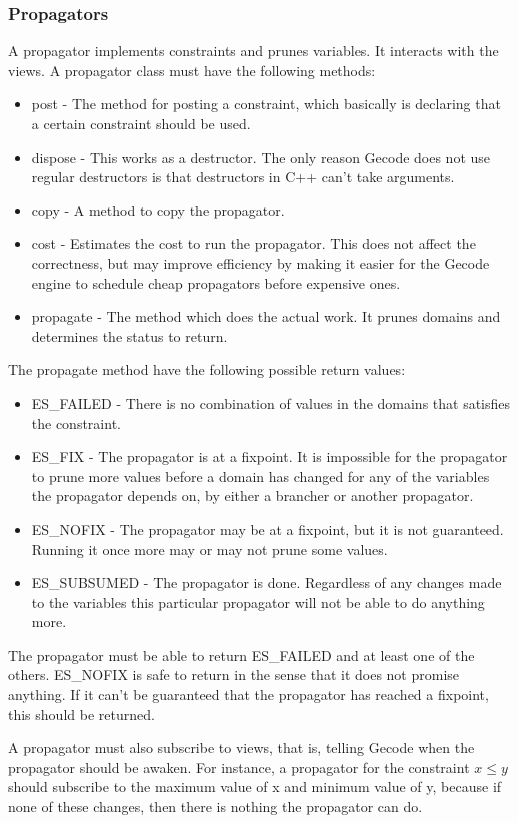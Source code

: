 \documentclass[a4paper,11pt]{article}
\begin{document}
\subsubsection{Propagators}
\label{sec:propagators}
A propagator implements constraints and prunes variables. It interacts with the views. A propagator class must have the following methods:
\begin{itemize}
\item{post} - The method for posting a constraint, which basically is declaring that a certain constraint should be used.
\item{dispose} - This works as a destructor. The only reason Gecode does not use regular destructors is that destructors in C++ can't take arguments.
\item{copy} - A method to copy the propagator.
\item{cost} - Estimates the cost to run the propagator. This does not affect the correctness, but may improve efficiency by making it easier for the Gecode engine to schedule cheap propagators before expensive ones.
\item{propagate} - The method which does the actual work. It prunes domains and determines the status to return.
\end{itemize}
The propagate method have the following possible return values:
\begin{itemize}
\item{ES\_FAILED} - There is no combination of values in the domains that satisfies the constraint. 
\item{ES\_FIX} - The propagator is at a fixpoint. It is impossible for the propagator to prune more values before a domain has changed for any of the variables the propagator depends on, by either a brancher or another propagator.
\item{ES\_NOFIX} - The propagator may be at a fixpoint, but it is not guaranteed. Running it once more may or may not prune some values. 
\item{ES\_SUBSUMED} - The propagator is done. Regardless of any changes made to the variables this particular propagator will not be able to do anything more.
\end{itemize}
The propagator must be able to return ES\_FAILED and at least one of the others. ES\_NOFIX is safe to return in the sense that it does not promise anything. If it can't be guaranteed that the propagator has reached a fixpoint, this should be returned. 

A propagator must also subscribe to views, that is, telling Gecode when the propagator should be awaken. For instance, a propagator for the constraint $x\le y$ should subscribe to the maximum value of x and minimum value of y, because if none of these changes, then there is nothing the propagator can do.
\end{document}
